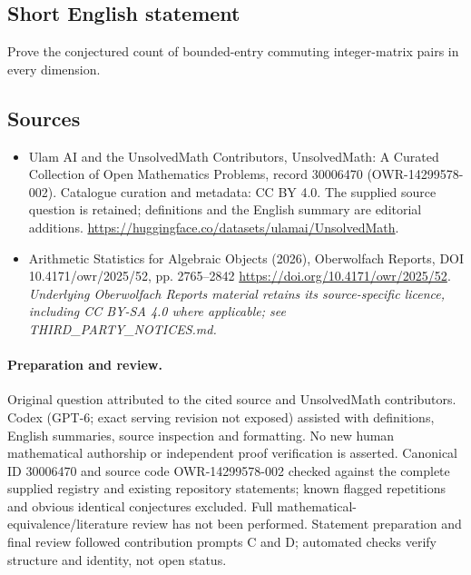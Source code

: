 \documentclass[11pt]{article}
\begin{document}
\subsection{Short English statement}
Prove the conjectured count of bounded-entry commuting integer-matrix pairs in every dimension.
\subsection{Sources}
\begin{itemize}
\item[\hypertarget{source:30006470:1}{S1}] Ulam AI and the UnsolvedMath Contributors, UnsolvedMath: A Curated Collection of Open Mathematics Problems, record 30006470 (OWR-14299578-002). Catalogue curation and metadata: CC BY 4.0. The supplied source question is retained; definitions and the English summary are editorial additions.
\url{https://huggingface.co/datasets/ulamai/UnsolvedMath}.
\item[\hypertarget{source:30006470:2}{S2}] Arithmetic Statistics for Algebraic Objects (2026), Oberwolfach Reports, DOI 10.4171/owr/2025/52, pp. 2765--2842
\url{https://doi.org/10.4171/owr/2025/52}.
\textit{Underlying Oberwolfach Reports material retains its source-specific licence, including CC BY-SA 4.0 where applicable; see THIRD\_PARTY\_NOTICES.md.}
\end{itemize}
\paragraph{Preparation and review.}
Original question attributed to the cited source and UnsolvedMath contributors. Codex (GPT-6; exact serving revision not exposed) assisted with definitions, English summaries, source inspection and formatting. No new human mathematical authorship or independent proof verification is asserted. Canonical ID 30006470 and source code OWR-14299578-002 checked against the complete supplied registry and existing repository statements; known flagged repetitions and obvious identical conjectures excluded. Full mathematical-equivalence/literature review has not been performed. Statement preparation and final review followed contribution prompts C and D; automated checks verify structure and identity, not open status.
\label{end:30006470}
\end{document}
